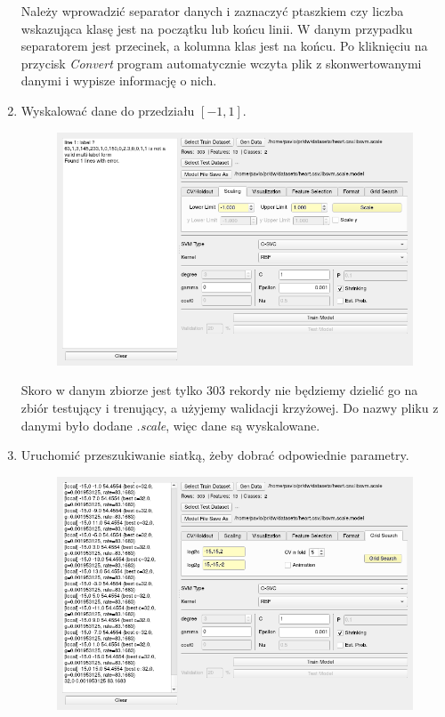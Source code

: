 \documentclass[paper=a4, fontsize=11pt]{scrartcl} %
\numberwithin{equation}{section} %
\numberwithin{figure}{section} %
\begin{document}
\begin{enumerate}[label={\textbf{Krok \theenumi :}},leftmargin=*]
    Należy wprowadzić separator danych i zaznaczyć ptaszkiem czy liczba wskazująca klasę jest
    na początku lub końcu linii. W danym przypadku separatorem jest przecinek, a kolumna klas
    jest na końcu. Po kliknięciu na przycisk \textit{Convert} program automatycznie wczyta plik
    z skonwertowanymi danymi i wypisze informację o nich.
    
    \item Wyskalować dane do przedziału $[-1, 1]$.

    \begin{figure}[H]
        \begin{center}
            \includegraphics[scale=0.7]{./img/ex2_st3.png}
        \end{center}
    \end{figure}

    Skoro w danym zbiorze jest tylko 303 rekordy nie będziemy dzielić go na zbiór testujący i
    trenujący, a użyjemy walidacji krzyżowej. Do nazwy pliku z danymi było dodane
    \textit{.scale}, więc dane są wyskalowane.

\newpage
    \item Uruchomić przeszukiwanie siatką, żeby dobrać odpowiednie parametry.

    \begin{figure}[H]
        \begin{center}
            \includegraphics[scale=0.7]{./img/ex2_st4.png}
        \end{center}
    \end{figure}


\end{enumerate}
\end{document}
